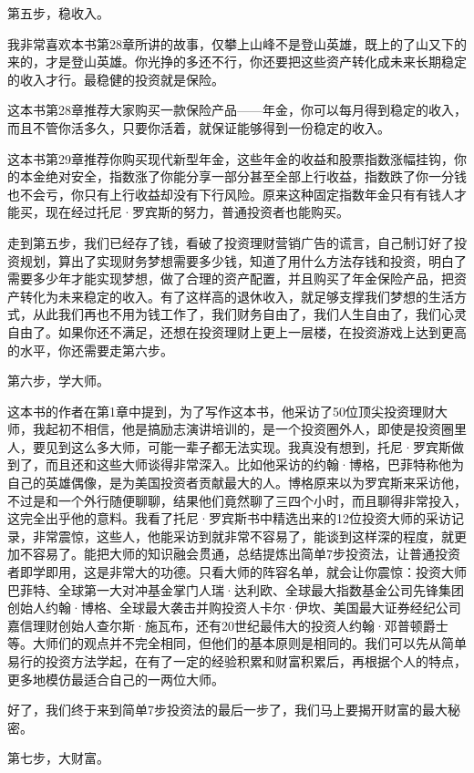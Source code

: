 第五步，稳收入。

我非常喜欢本书第28章所讲的故事，仅攀上山峰不是登山英雄，既上的了山又下的来的，才是登山英雄。你光挣的多还不行，你还要把这些资产转化成未来长期稳定的收入才行。最稳健的投资就是保险。

这本书第28章推荐大家购买一款保险产品——年金，你可以每月得到稳定的收入，而且不管你活多久，只要你活着，就保证能够得到一份稳定的收入。

这本书第29章推荐你购买现代新型年金，这些年金的收益和股票指数涨幅挂钩，你的本金绝对安全，指数涨了你能分享一部分甚至全部上行收益，指数跌了你一分钱也不会亏，你只有上行收益却没有下行风险。原来这种固定指数年金只有有钱人才能买，现在经过托尼·罗宾斯的努力，普通投资者也能购买。

走到第五步，我们已经存了钱，看破了投资理财营销广告的谎言，自己制订好了投资规划，算出了实现财务梦想需要多少钱，知道了用什么方法存钱和投资，明白了需要多少年才能实现梦想，做了合理的资产配置，并且购买了年金保险产品，把资产转化为未来稳定的收入。有了这样高的退休收入，就足够支撑我们梦想的生活方式，从此我们再也不用为钱工作了，我们财务自由了，我们人生自由了，我们心灵自由了。如果你还不满足，还想在投资理财上更上一层楼，在投资游戏上达到更高的水平，你还需要走第六步。

第六步，学大师。

这本书的作者在第1章中提到，为了写作这本书，他采访了50位顶尖投资理财大师，我起初不相信，他是搞励志演讲培训的，是一个投资圈外人，即使是投资圈里人，要见到这么多大师，可能一辈子都无法实现。我真没有想到，托尼·罗宾斯做到了，而且还和这些大师谈得非常深入。比如他采访的约翰·博格，巴菲特称他为自己的英雄偶像，是为美国投资者贡献最大的人。博格原来以为罗宾斯来采访他，不过是和一个外行随便聊聊，结果他们竟然聊了三四个小时，而且聊得非常投入，这完全出乎他的意料。我看了托尼·罗宾斯书中精选出来的12位投资大师的采访记录，非常震惊，这些人，他能采访到就非常不容易了，能谈到这样深的程度，就更加不容易了。能把大师的知识融会贯通，总结提炼出简单7步投资法，让普通投资者即学即用，这是非常大的功德。只看大师的阵容名单，就会让你震惊：投资大师巴菲特、全球第一大对冲基金掌门人瑞·达利欧、全球最大指数基金公司先锋集团创始人约翰·博格、全球最大袭击并购投资人卡尔·伊坎、美国最大证券经纪公司嘉信理财创始人查尔斯·施瓦布，还有20世纪最伟大的投资人约翰·邓普顿爵士等。大师们的观点并不完全相同，但他们的基本原则是相同的。我们可以先从简单易行的投资方法学起，在有了一定的经验积累和财富积累后，再根据个人的特点，更多地模仿最适合自己的一两位大师。

好了，我们终于来到简单7步投资法的最后一步了，我们马上要揭开财富的最大秘密。

第七步，大财富。

